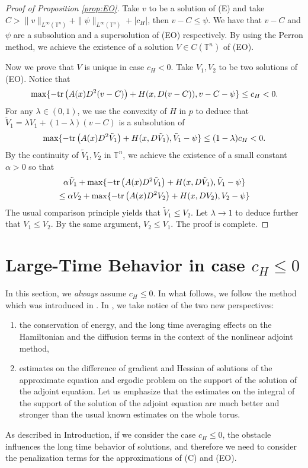 \documentclass[12pt,reqno]{amsart}
\theoremstyle{plain}
\theoremstyle{remark}
\numberwithin{equation}{section}
\begin{document}
\begin{proof}[Proof of Proposition {\rm\ref{prop:EO}}]
Take $v$ to be a solution of (E) and take $C>\|v\|_{L^\infty({\mathbb{T}}^n)}+\|\psi\|_{L^\infty({\mathbb{T}}^n)}+|c_H|$, then $v-C \leq \psi$. We have that $v-C$ and $\psi$ are a subsolution and a supersolution of (EO) respectively. By using the Perron method, we achieve the existence of a solution $V\in C({\mathbb{T}}^n)$ of (EO).

Now we prove that $V$ is unique in case $c_H<0$. Take $V_1, V_2$ to be two solutions of (EO). Notice that
$$
\max\{-{{\rm tr}\,}\big(A(x)D^2(v-C)\big)+H(x,D(v-C)), v-C-\psi\} \leq c_H <0.
$$
For any ${\lambda}\in (0,1)$, we use the convexity of $H$ in $p$ to deduce that 
$\tilde V_1={\lambda} V_1+(1-{\lambda})(v-C)$ is a subsolution of
$$
\max\{-{{\rm tr}\,}\big(A(x)D^2\tilde V_1 \big)+H(x,D\tilde V_1), \tilde V_1-\psi\} \leq (1-{\lambda})c_H <0.
$$
By the continuity of $\tilde V_1, V_2$ in ${\mathbb{T}}^n$, we achieve the existence of a small constant ${\alpha}>0$ so that
\begin{multline}\label{uni-c}
{\alpha} \tilde V_1+\max\{-{{\rm tr}\,}\big(A(x)D^2\tilde V_1 \big)+H(x,D\tilde V_1), \tilde V_1-\psi\}\\
\leq {\alpha}  V_2+\max\{-{{\rm tr}\,}\big(A(x)D^2 V_2 \big)+H(x,D V_2),  V_2-\psi\}
\end{multline}
The usual comparison principle yields that $\tilde V_1 \leq V_2$. Let ${\lambda} \to 1$ to deduce further that $V_1 \leq V_2$. By the same argument, $V_2 \leq V_1$. 
The proof is complete.
\end{proof}

\section{Large-Time Behavior in case $c_H\leq 0$} 
In this section, we \textit{always} assume $c_H\le0$. 
In what follows, we follow the method which was introduced in \cite{CGMT}. 
In \cite{CGMT}, we take notice of the two new perspectives:  
\begin{enumerate}
\item
the conservation of energy, and
the long time averaging effects on the Hamiltonian and the diffusion
terms in the context of the nonlinear adjoint method,  
\item
estimates on the difference of gradient and Hessian of solutions of
the approximate equation and ergodic problem
on the support of the solution of the adjoint equation.
Let us emphasize that the estimates on the integral of the support of the 
solution of the adjoint equation are much better and stronger than the usual
known estimates on the whole torus. 
  
\end{enumerate}
As described in Introduction, if we consider the case $c_H\le0$, the obstacle 
influences the long time behavior of solutions, and therefore we need to 
consider the penalization terms for the approximations of (C) and (EO). 
\end{document}
